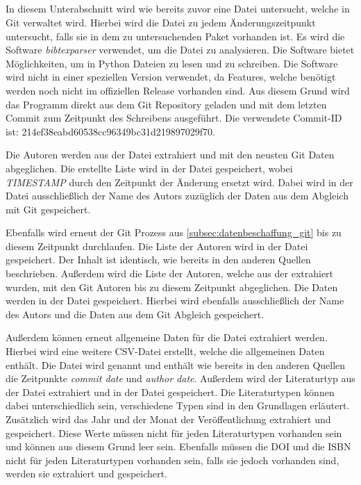 \subsection{}
\label{subsec:datenbeschaffung_bibtex}
In diesem Unterabschnitt wird wie bereits zuvor eine Datei untersucht, welche in Git verwaltet wird.
Hierbei wird die  Datei zu jedem Änderungszeitpunkt untersucht, falls sie in dem zu untersuchenden Paket vorhanden ist.
Es wird die Software \emph{bibtexparser} verwendet, um die  Datei zu analysieren.
Die Software bietet Möglichkeiten, um in Python  Dateien zu lesen und zu schreiben.
Die Software wird nicht in einer speziellen Version verwendet, da Features, welche benötigt werden noch nicht im offiziellen Release vorhanden sind.
Aus diesem Grund wird das Programm direkt aus dem Git Repository geladen und mit dem letzten Commit zum Zeitpunkt des Schreibens ausgeführt.
Die verwendete Commit-ID ist: 214ef38eabd60538cc96349bc31d219897029f70.

Die Autoren werden aus der  Datei extrahiert und mit den neusten Git Daten abgeglichen.
Die erstellte Liste wird in der Datei  gespeichert, wobei \emph{TIMESTAMP} durch den Zeitpunkt der Änderung ersetzt wird.
Dabei wird in der Datei ausschließlich der Name des Autors zuzüglich der Daten aus dem Abgleich mit Git gespeichert.

Ebenfalls wird erneut der Git Prozess aus \autoref{subsec:datenbeschaffung_git} bis zu diesem Zeitpunkt durchlaufen.
Die Liste der Autoren wird in der Datei  gespeichert.
Der Inhalt ist identisch, wie bereits in den anderen Quellen beschrieben.
Außerdem wird die Liste der Autoren, welche aus der  extrahiert wurden, mit den Git Autoren bis zu diesem Zeitpunkt abgeglichen.
Die Daten werden in der Datei  gespeichert.
Hierbei wird ebenfalls ausschließlich der Name des Autors und die Daten aus dem Git Abgleich gespeichert.

Außerdem können erneut allgemeine Daten für die  Datei extrahiert werden.
Hierbei wird eine weitere CSV-Datei erstellt, welche die allgemeinen Daten enthält.
Die Datei wird  genannt und enthält wie bereits in den anderen Quellen die Zeitpunkte \emph{commit date} und \emph{author date}.
Außerdem wird der Literaturtyp aus der Datei extrahiert und in der Datei gespeichert.
Die Literaturtypen können dabei unterschiedlich sein, verschiedene Typen sind in den Grundlagen erläutert.
Zusätzlich wird das Jahr und der Monat der Veröffentlichung extrahiert und gespeichert.
Diese Werte müssen nicht für jeden Literaturtypen vorhanden sein und können aus diesem Grund leer sein.
Ebenfalls müssen die DOI und die ISBN nicht für jeden Literaturtypen vorhanden sein, falls sie jedoch vorhanden sind, werden sie extrahiert und gespeichert.

